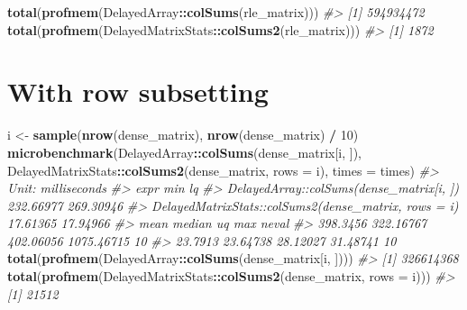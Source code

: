 \documentclass[]{book}
\newenvironment{Shaded}{\begin{snugshade}}{\end{snugshade}}
\newcommand{\KeywordTok}[1]{\textcolor[rgb]{0.13,0.29,0.53}{\textbf{#1}}}
\newcommand{\DataTypeTok}[1]{\textcolor[rgb]{0.13,0.29,0.53}{#1}}
\newcommand{\DecValTok}[1]{\textcolor[rgb]{0.00,0.00,0.81}{#1}}
\newcommand{\StringTok}[1]{\textcolor[rgb]{0.31,0.60,0.02}{#1}}
\newcommand{\CommentTok}[1]{\textcolor[rgb]{0.56,0.35,0.01}{\textit{#1}}}
\newcommand{\OperatorTok}[1]{\textcolor[rgb]{0.81,0.36,0.00}{\textbf{#1}}}
\newcommand{\NormalTok}[1]{#1}
\begin{document}
\begin{Shaded}
\begin{Highlighting}[]
\KeywordTok{total}\NormalTok{(}\KeywordTok{profmem}\NormalTok{(DelayedArray}\OperatorTok{::}\KeywordTok{colSums}\NormalTok{(rle_matrix)))}
\CommentTok{#> [1] 594934472}
\KeywordTok{total}\NormalTok{(}\KeywordTok{profmem}\NormalTok{(DelayedMatrixStats}\OperatorTok{::}\KeywordTok{colSums2}\NormalTok{(rle_matrix)))}
\CommentTok{#> [1] 1872}
\end{Highlighting}
\end{Shaded}

\section{With row subsetting}\label{with-row-subsetting}

\begin{Shaded}
\begin{Highlighting}[]
\NormalTok{i <-}\StringTok{ }\KeywordTok{sample}\NormalTok{(}\KeywordTok{nrow}\NormalTok{(dense_matrix), }\KeywordTok{nrow}\NormalTok{(dense_matrix) }\OperatorTok{/}\StringTok{ }\DecValTok{10}\NormalTok{)}
\KeywordTok{microbenchmark}\NormalTok{(DelayedArray}\OperatorTok{::}\KeywordTok{colSums}\NormalTok{(dense_matrix[i, ]),}
\NormalTok{               DelayedMatrixStats}\OperatorTok{::}\KeywordTok{colSums2}\NormalTok{(dense_matrix, }\DataTypeTok{rows =}\NormalTok{ i),}
               \DataTypeTok{times =}\NormalTok{ times)}
\CommentTok{#> Unit: milliseconds}
\CommentTok{#>                                                  expr       min        lq}
\CommentTok{#>              DelayedArray::colSums(dense_matrix[i, ]) 232.66977 269.30946}
\CommentTok{#>  DelayedMatrixStats::colSums2(dense_matrix, rows = i)  17.61365  17.94966}
\CommentTok{#>      mean    median        uq        max neval}
\CommentTok{#>  398.3456 322.16767 402.06056 1075.46715    10}
\CommentTok{#>   23.7913  23.64738  28.12027   31.48741    10}
\KeywordTok{total}\NormalTok{(}\KeywordTok{profmem}\NormalTok{(DelayedArray}\OperatorTok{::}\KeywordTok{colSums}\NormalTok{(dense_matrix[i, ])))}
\CommentTok{#> [1] 326614368}
\KeywordTok{total}\NormalTok{(}\KeywordTok{profmem}\NormalTok{(DelayedMatrixStats}\OperatorTok{::}\KeywordTok{colSums2}\NormalTok{(dense_matrix, }\DataTypeTok{rows =}\NormalTok{ i)))}
\CommentTok{#> [1] 21512}


\end{Highlighting}
\end{Shaded}
\end{document}
